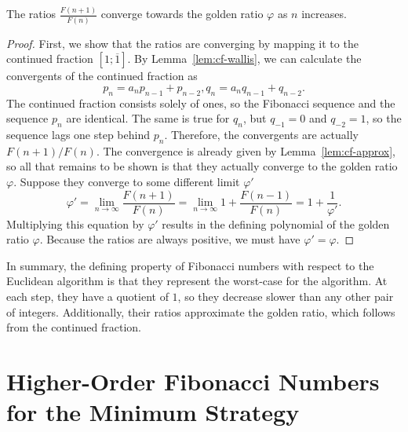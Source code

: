 \begin{theorem}
  The ratios $\frac{F(n+1)}{F(n)}$ converge towards the golden ratio $φ$ as $n$ increases.
\end{theorem}

\begin{proof}
  First, we show that the ratios are converging by mapping it to the continued fraction $[1; \overline{1}]$.
  By Lemma~\ref{lem:cf-wallis}, we can calculate the convergents of the continued fraction as
  \[
    p_n = a_n p_{n-1} + p_{n-2}, q_n = a_n q_{n-1} + q_{n-2}.
  \]
  The continued fraction consists solely of ones,
  so the Fibonacci sequence and the sequence $p_n$ are identical.
  The same is true for $q_n$, but $q_{-1} = 0$ and $q_{-2} = 1$, so the sequence lags one step behind $p_n$.
  Therefore, the convergents are actually $F(n+1)/F(n)$.
  The convergence is already given by Lemma~\vref{lem:cf-approx},
  so all that remains to be shown is that they actually converge to the golden ratio $φ$.
  Suppose they converge to some different limit $φ'$
  \[
    φ' = \lim_{n → ∞} \frac{F(n+1)}{F(n)} = \lim_{n → ∞} 1 + \frac{F(n-1)}{F(n)} = 1 + \frac{1}{φ'}.
  \]
  Multiplying this equation by $φ'$ results in the defining polynomial of the golden ratio $φ$.
  Because the ratios are always positive, we must have $φ' = φ$.
\end{proof}


In summary,
the defining property of Fibonacci numbers with respect to the Euclidean
algorithm is that they represent the worst-case for the algorithm.
At each step, they have a quotient of $1$, so they decrease slower than any other pair of integers.
Additionally, their ratios approximate the golden ratio,
which follows from the continued fraction.

\section{Higher-Order Fibonacci Numbers for the Minimum Strategy}


